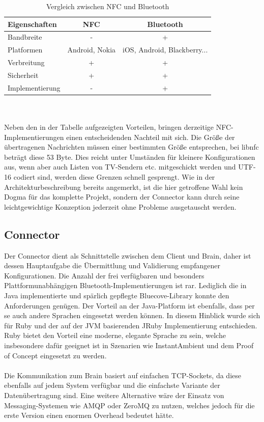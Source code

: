   \begin{table}
     \centering
     \begin{tabular}{| l | c | c |}
			\hline
      \textbf{Eigenschaften} & \textbf{NFC}  & \textbf{Bluetooth} \\ \hline
       Bandbreite  & -	& + \\ \hline
       Platformen  & Android, Nokia & iOS, Android, Blackberry...   \\ \hline
       Verbreitung & + & +   \\ \hline
			 Sicherheit  & + & + \\ \hline
			 Implementierung  & - & + \\ \hline
			
     \end{tabular} 
 
     \caption{Vergleich zwischen NFC und Bluetooth }
 
   \end{table}

\\\\
Neben den in der Tabelle aufgezeigten Vorteilen, bringen derzeitige NFC-Implementierungen einen entscheidenden Nachteil mit sich. Die Größe der übertragenen Nachrichten müssen einer bestimmten Größe entsprechen, bei libnfc beträgt diese 53 Byte. Dies reicht unter Umständen für kleinere Konfigurationen aus, wenn aber auch Listen von TV-Sendern etc. mitgeschickt werden und UTF-16 codiert sind, werden diese Grenzen schnell gesprengt. 
Wie in der Architekturbeschreibung bereits angemerkt, ist die hier getroffene Wahl kein Dogma für das komplette Projekt, sondern der Connector kann durch seine leichtgewichtige Konzeption jederzeit ohne Probleme ausgetauscht werden.

\subsection{Connector}

Der Connector dient als Schnittstelle zwischen dem Client und Brain, daher ist dessen Hauptaufgabe die Übermittlung und Validierung empfangener Konfigurationen. Die Anzahl der frei verfügbaren und besonders Plattformunabhängigen Bluetooth-Implementierungen ist rar. Lediglich die in Java implementierte und spärlich gepflegte Bluecove-Library konnte den Anforderungen genügen. Der Vorteil an der Java-Platform ist ebenfalls, dass per se auch andere Sprachen eingesetzt werden können. In diesem Hinblick wurde sich für Ruby und der auf der JVM basierenden JRuby Implementierung entschieden. Ruby bietet den Vorteil eine moderne, elegante Sprache zu sein, welche insbesondere dafür geeignet ist in Szenarien wie InstantAmbient und dem Proof of Concept eingesetzt zu werden.
\\\\
Die Kommunikation zum Brain basiert auf einfachen TCP-Sockets, da diese ebenfalls auf jedem System verfügbar und die einfachste Variante der Datenübertragung sind. Eine weitere Alternative wäre der Einsatz von Messaging-Systemen wie AMQP oder ZeroMQ zu nutzen, welches jedoch für die erste Version einen enormen Overhead bedeutet hätte.


